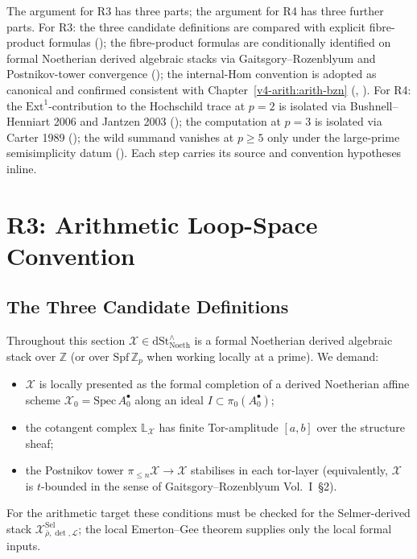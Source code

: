 The argument for R3 has three parts; the argument for R4 has three
further parts. For R3: the three candidate definitions are compared
with explicit fibre-product formulas
(); the fibre-product formulas
are conditionally identified on formal Noetherian derived algebraic
stacks via Gaitsgory--Rozenblyum and Postnikov-tower convergence
(); the internal-Hom convention is
adopted as canonical and confirmed consistent with Chapter~\ref{v4-arith:arith-bzn}
(,
).
For R4: the \(\mathrm{Ext}^{1}\)-contribution to the Hochschild trace at \(p=2\) is
isolated via Bushnell--Henniart 2006 and Jantzen 2003
(); the computation at \(p=3\) is
isolated via Carter 1989
(); the wild summand vanishes at \(p\geq 5\)
only under the large-prime semisimplicity datum
().
Each step carries its source and convention hypotheses inline.

\section{R3: Arithmetic Loop-Space Convention}
\label{v4-arith:bzn-rcompletion:R3}

\subsection{The Three Candidate Definitions}

Throughout this section \(\mathcal{X}\in\mathrm{dSt}^{\wedge}_{\mathrm{Noeth}}\)
is a formal Noetherian derived algebraic stack over \(\mathbb{Z}\)
(or over \(\mathrm{Spf}\,\mathbb{Z}_{p}\) when working locally at a
prime). We demand:
\begin{itemize}
\item \(\mathcal{X}\) is locally presented as the formal completion
of a derived Noetherian affine scheme
\(\mathcal{X}_{0}=\mathrm{Spec}\,A_{0}^{\bullet}\) along an ideal
\(I\subset\pi_{0}(A_{0}^{\bullet})\);
\item the cotangent complex \(\mathbb{L}_{\mathcal{X}}\) has finite
Tor-amplitude \([a,b]\) over the structure sheaf;
\item the Postnikov tower \(\pi_{\leq n}\mathcal{X}\to\mathcal{X}\)
stabilises in each tor-layer (equivalently, \(\mathcal{X}\) is
\(t\)-bounded in the sense of Gaitsgory--Rozenblyum Vol.~I~\S2).
\end{itemize}
For the arithmetic target these conditions must be checked
for the Selmer-derived stack
\(\mathcal{X}^{\mathrm{Sel}}_{\bar\rho,\det,\mathcal{L}}\); the local
Emerton--Gee theorem supplies only the local formal inputs.

